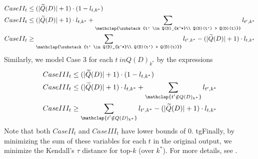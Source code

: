 {{\allowdisplaybreaks
\begin{align*}
    CaseII_t &\leq (|\widetilde{Q}(D)| + 1) \cdot (1 - l_{t, k^*}) \\
    CaseII_t &\leq (|\widetilde{Q}(D)| + 1) \cdot l_{t, k^*} + \sum_{\mathclap{\substack{t' \in Q(D)_{k^*}\\ Q(D)(t') > Q(D)(t)}}} l_{t', k^*} \\
    CaseII_t &\geq \sum_{\mathclap{\substack{t' \in Q(D)_{k^*}\\ Q(D)(t') > Q(D)(t)}}} l_{t', k^*} - (|\widetilde{Q}(D)| + 1) \cdot l_{t, k^*}
\end{align*}
}
Similarly, we model Case 3 for each $t \ in Q(D)_{k^*}$ by the expressions
\begin{align*}
    CaseIII_t &\leq (|\widetilde{Q}(D)| + 1) \cdot (1 - l_{t, k^*}) \\
    CaseIII_t &\leq (|\widetilde{Q}(D)| + 1) \cdot l_{t, k^*} + \sum_{\mathclap{\substack{t' \notin Q(D)_{k^*}}}} l_{t', k^*} \\
    CaseIII_t &\geq \sum_{\mathclap{\substack{t' \notin Q(D)_{k^*}}}} l_{t', k^*} - (|\widetilde{Q}(D)| + 1) \cdot l_{t, k^*}
\end{align*}
Note that both $CaseII_t$ and $CaseIII_t$ have lower bounds of $0$. tgFinally, by minimizing the sum of these variables for each $t$ in the original output, we minimize the Kendall's $\tau$ distance for top-$k$ (over $k^*$).
\else For more details, see \cite{Extended, impl}.} \fi



